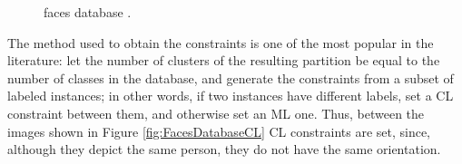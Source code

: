 \begin{figure}[bth]
	\myfloatalign
	 \quad
	 \quad
	 \quad
	\caption[ faces database.]{ faces database \cite{davidson2007survey}.}\label{fig:CMUFacesDatabase}
\end{figure}

The method used to obtain the constraints is one of the most popular in the literature: let the number of clusters of the resulting partition be equal to the number of classes in the database, and generate the constraints from a subset of labeled instances; in other words, if two instances have different labels, set a \acs{CL} constraint between them, and otherwise set an \acs{ML} one. Thus, between the images shown in Figure \ref{fig:FacesDatabaseCL} \acs{CL} constraints are set, since, although they depict the same person, they do not have the same orientation.

